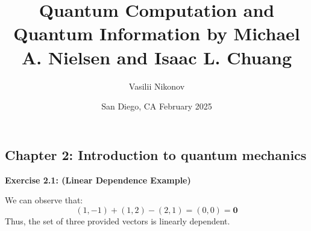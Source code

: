 \documentclass{article}
\title{Quantum Computation and Quantum Information by Michael A. Nielsen and Isaac L. Chuang}
\author{Vasilii Nikonov}
\date{San Diego, CA February 2025}
\begin{document}
\maketitle

\subsection*{Chapter 2: Introduction to quantum mechanics}

\begin{framed} 
    \noindent \textbf{Exercise 2.1: (Linear Dependence Example)}
    
    \medskip
    We can observe that:
    $$
    (1, -1) + (1, 2) - (2, 1) = (0,0) = \boldsymbol{0}
    $$
    Thus, the set of three provided vectors is linearly dependent.
\end{framed}

\bigskip
\end{document}
